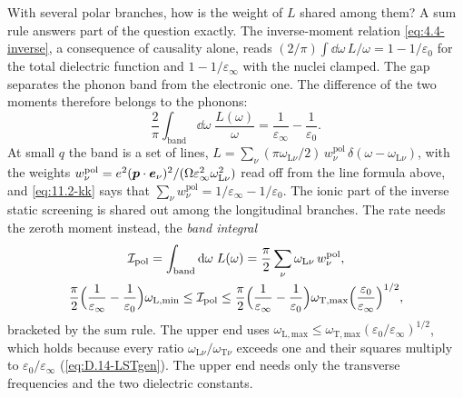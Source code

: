 With several polar branches, how is the weight of $L$ shared among them? A sum rule answers part of the question exactly. The inverse-moment relation \cref{eq:4.4-inverse}, a consequence of causality alone, reads $(2/\pi)\int\dd\omega\,L/\omega = 1 - 1/\varepsilon_0$ for the total dielectric function and $1 - 1/\varepsilon_\infty$ with the nuclei clamped. The gap separates the phonon band from the electronic one. The difference of the two moments therefore belongs to the phonons:
\begin{equation}
  \frac{2}{\pi}\int_{\mathrm{band}}\dd\omega\;\frac{L(\omega)}{\omega} = \frac{1}{\varepsilon_\infty} - \frac{1}{\varepsilon_0} .
  \label{eq:11.2-kk}
\end{equation}
At small $q$ the band is a set of lines, $L = \sum_\nu(\pi\omega_{\mathrm{L}\nu}/2)\,w^{\mathrm{pol}}_\nu\,\delta(\omega - \omega_{\mathrm{L}\nu})$, with the weights $w^{\mathrm{pol}}_\nu = e^2(\bm{p}\cdot\bm{e}_\nu)^2/(\Omega\varepsilon_\infty^2\omega_{\mathrm{L}\nu}^2)$ read off from the line formula above, and \cref{eq:11.2-kk} says that $\sum_\nu w^{\mathrm{pol}}_\nu = 1/\varepsilon_\infty - 1/\varepsilon_0$. The ionic part of the inverse static screening is shared out among the longitudinal branches. The rate needs the zeroth moment instead, the \emph{band integral}
\begin{equation}
  \begin{gathered}
  \mathcal{I}_{\mathrm{pol}} = \int_{\mathrm{band}}\mathrm{d}\omega\;L(\omega) = \frac{\pi}{2}\sum_\nu\omega_{\mathrm{L}\nu}\,w^{\mathrm{pol}}_\nu , \\
  \frac{\pi}{2}\Bigl(\frac{1}{\varepsilon_\infty} - \frac{1}{\varepsilon_0}\Bigr)\omega_{\mathrm{L,min}} \le \mathcal{I}_{\mathrm{pol}} \le \frac{\pi}{2}\Bigl(\frac{1}{\varepsilon_\infty} - \frac{1}{\varepsilon_0}\Bigr)\omega_{\mathrm{T,max}}\Bigl(\frac{\varepsilon_0}{\varepsilon_\infty}\Bigr)^{1/2} ,
  \end{gathered}
  \label{eq:11.2-Ipol}
\end{equation}
bracketed by the sum rule. The upper end uses $\omega_{\mathrm{L,max}} \le \omega_{\mathrm{T,max}}(\varepsilon_0/\varepsilon_\infty)^{1/2}$, which holds because every ratio $\omega_{\mathrm{L}\nu}/\omega_{\mathrm{T}\nu}$ exceeds one and their squares multiply to $\varepsilon_0/\varepsilon_\infty$ (\cref{eq:D.14-LSTgen}). The upper end needs only the transverse frequencies and the two dielectric constants.


